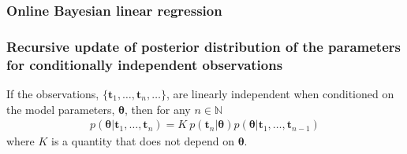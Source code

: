 \subsubsection{Online Bayesian linear regression}

\begin{frame}
    \frametitle{Recursive update of posterior distribution of the parameters for conditionally independent observations}
	\scriptsize
	\begin{claim}
		If the observations, $\{\mathbf{t}_1,\ldots,\mathbf{t}_n,\dots\}$, are linearly independent when conditioned on the model parameters, $\boldsymbol{\theta}$, then for any $n\in\mathbb{N}$
		\begin{align}
			p(\boldsymbol{\theta}|\mathbf{t}_1,\ldots,\mathbf{t}_n)=K\ p(\mathbf{t}_n|\boldsymbol{\theta})p(\boldsymbol{\theta}|\mathbf{t}_1,\ldots,\mathbf{t}_{n-1})
		\end{align}
		where $K$ is a quantity that does not depend on $\boldsymbol{\theta}$.
	\end{claim}
	\normalsize
\end{frame}

